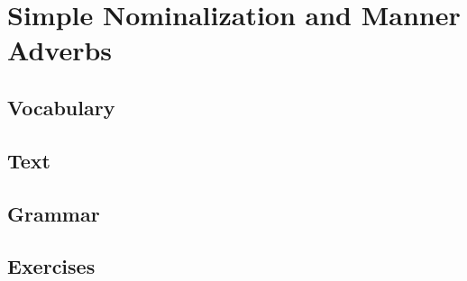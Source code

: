\chapter{Simple Nominalization and Manner Adverbs}
\section*{Vocabulary}
\section*{Text}
\section*{Grammar}
\section*{Exercises}
